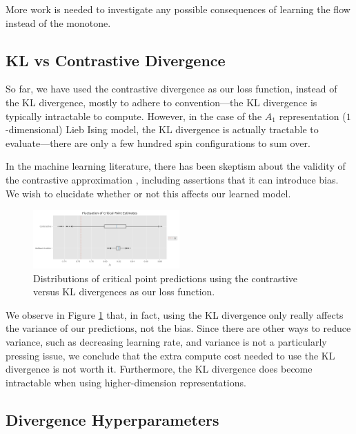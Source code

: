 \documentclass[%
    reprint,
    amsmath,amssymb,
    aps,
]{revtex4-2}
\begin{document}
More work is needed to investigate any possible consequences of learning the flow instead of the monotone. 

\subsection{KL vs Contrastive Divergence}

So far, we have used the contrastive divergence as our loss function, instead of the KL divergence, mostly to adhere to convention—the KL divergence is typically intractable to compute. 
However, in the case of the $A_1$ representation ($1$-dimensional) Lieb Ising model, the KL divergence is actually tractable to evaluate—there are only a few hundred spin configurations to sum over. 

In the machine learning literature, there has been skeptism about the validity of the contrastive approximation \cite{bengio-cd, sutskever-cd, carreira-cd}, including assertions that it can introduce bias. 
We wish to elucidate whether or not this affects our learned model. 

\begin{figure}[h]
    \includegraphics[width=0.5\textwidth]{tex/images/a1_critical_points_divergence_boxplot.png}
    \caption{\label{fig:cd-kl}
        Distributions of critical point predictions using the contrastive versus KL divergences as our loss function. 
    }
\end{figure}

We observe in Figure \ref{fig:cd-kl} that, in fact, using the KL divergence only really affects the variance of our predictions, not the bias. 
Since there are other ways to reduce variance, such as decreasing learning rate, and variance is not a particularly pressing issue, we conclude that the extra compute cost needed to use the KL divergence is not worth it. 
Furthermore, the KL divergence does become intractable when using higher-dimension representations. 

\subsection{Divergence Hyperparameters} \label{sec:cd-hyperparameters}
\end{document}
